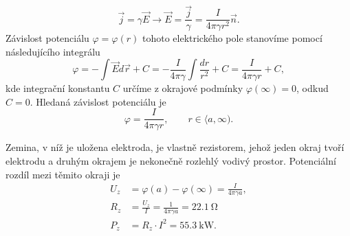 \begin{mdframed}[style=mdexam]
\begin{example}
    \begin{equation*}
      \vec{j}= \gamma\vec{E}\rightarrow\vec{E}=
      \frac{\vec{j}}{\gamma}=\frac{I}{4\pi\gamma r^2}\vec{n}.
    \end{equation*}
    Závislost potenciálu $\varphi=\varphi(r)$ tohoto elektrického pole stanovíme pomocí
    následujícího integrálu
    \begin{equation}
      \varphi = - \int\vec{E}d\vec{r}+C = -\frac{I}{4\pi\gamma}\int\frac{dr}{r^2} + C 
              =   \frac{I}{4\pi\gamma r} + C, \nonumber
    \end{equation} 
    kde integrační konstantu $C$ určíme z okrajové podmínky $\varphi(\infty)=0$, odkud $C=0$.
    Hledaná závislost potenciálu je
    \begin{equation*}
      \varphi = \frac{I}{4\pi\gamma r}, \qquad r\in\langle a, \infty). 
    \end{equation*}           
    
    Zemina, v níž je uložena elektroda, je vlastně rezistorem, jehož jeden okraj tvoří elektrodu a
    druhým okrajem je nekonečně rozlehlý vodivý prostor. Potenciální rozdíl mezi těmito okraji je
    \begin{align*}
      U_z &= \varphi(a) - \varphi(\infty)= \frac{I}{4\pi\gamma a},             \\
      R_z &= \frac{U_z}{I} = \frac{1}{4\pi\gamma a} = \SI{22,1}{\ohm}          \\ 
      P_z &= R_z\cdot I^2 = \SI{55,3}{\kilo\watt}. 
    \end{align*}
  \end{example}
\end{mdframed}


